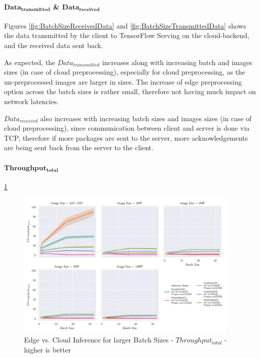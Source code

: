 \paragraph{$\mathbf{Data_{transmitted}}$ \& $\mathbf{Data_{received}}$}
Figures \ref{fig:BatchSizeReceivedData} and \ref{fig:BatchSizeTransmittedData} shows the data transmitted by the client to TensorFlow Serving on the cloud-backend, and the received data sent back.

As expected, the $Data_{transmitted}$ increases along with increasing batch and images sizes (in case of cloud preprocessing), especially for cloud preprocessing, as the un-preprocessed images are larger in sizes.
The increase of edge preprocessing option across the batch sizes is rather small, therefore not having much impact on network latencies.

$Data_{received}$ also increases with increasing batch sizes and images sizes (in case of cloud preprocessing), since communication between client and server is done via TCP, therefore if more packages are sent to the server, more acknowledgements are being sent back from the server to the client.


\paragraph{$\mathbf{Throughput_{total}}$}
\ref{fig:BatchSizeTotalThroughput}
\begin{figure}[!htb]
\centering
\includegraphics[width=0.95\textwidth]{./Bilder/single_plots/batch_size_plots/Effects_of_Batch_size_Total_Throughput_(Preprocessing_+_Inference).pdf}
\caption{Edge vs. Cloud Inference for larger Batch Sizes -  $Throughput_{total}$ - higher is better}
\label{fig:BatchSizeTotalThroughput}
\end{figure}



